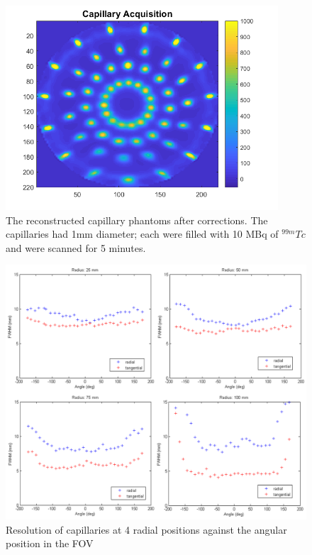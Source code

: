 \begin{figure}[!t]
\centering
\includegraphics[width=4in]{figures/Capillary_newLRF}

\caption{The reconstructed capillary phantoms after corrections. The capillaries had 1mm diameter; each were filled with 10 MBq of $^{99m}Tc$ and were scanned for 5 minutes.}
\label{fig_ImageRes}
\end{figure}

\begin{figure}[!t]
\centering
\includegraphics[width=5in]{figures/resolutions.png}

\caption{Resolution of capillaries at 4 radial positions against the angular position in the \acrshort{FOV}}
\label{fig_resolution}
\end{figure}

